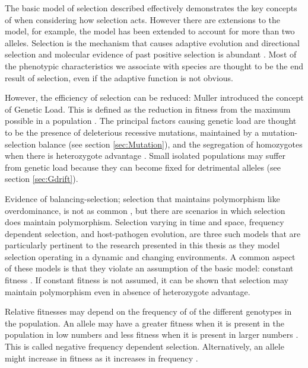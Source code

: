The basic model of selection described effectively demonstrates the key concepts of when considering how selection acts.
However there are extensions to the model, for example, the model has been extended to account for more than two alleles.
Selection is the mechanism that causes adaptive evolution and directional selection and molecular evidence of past positive selection is abundant \parencite{Hoekstra2007}.
Most of the phenotypic characteristics we associate with species are thought to be the end result of selection, even if the adaptive function is not obvious. 

However, the efficiency of selection can be reduced:
Muller introduced the concept of Genetic Load. This is defined as the reduction in fitness from the maximum possible in a population \parencite{Davis2011}.
The principal factors causing genetic load are thought to be the presence of 
deleterious recessive mutations, maintained by a mutation-selection balance (see section \ref{sec:Mutation}), and the segregation of homozygotes when there is heterozygote advantage \parencite{Davis2011}.
Small isolated populations may suffer from genetic load because they can become fixed for detrimental alleles (see section \ref{sec:Gdrift}).

Evidence of balancing-selection; selection that maintains polymorphism like overdominance, is not as common \parencite{Bubb2006}, but there are scenarios in which selection does maintain polymorphism.
Selection varying in time and space, frequency dependent selection, and host-pathogen evolution, are three such models that are particularly pertinent to the research presented in this thesis as they model selection operating in a dynamic and changing environments.
A common aspect of these models is that they violate an assumption of the basic model: constant fitness \parencite{Charlesworth2010}. If constant fitness is not assumed, it can be shown that selection may maintain polymorphism even in absence of heterozygote advantage.

Relative fitnesses may depend on the frequency of of the different genotypes in the population. An allele may have a greater fitness when it is present in the population in low numbers and less fitness when it is present in larger numbers \parencite{Hedrick2010,Charlesworth2010}.
This is called negative frequency dependent selection.
Alternatively, an allele might increase in fitness as it increases in frequency \parencite{Hedrick2010,Charlesworth2010}.

